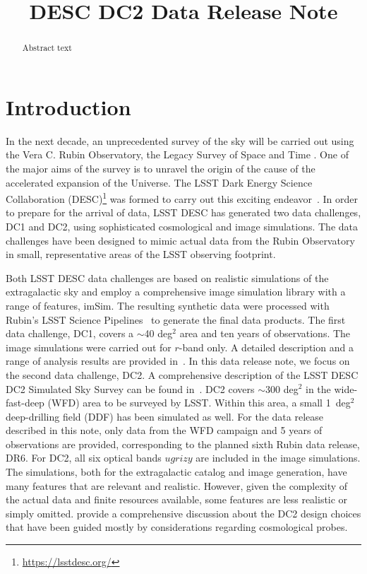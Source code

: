 \documentclass[modern]{descnote}
\begin{document}
\title{DESC DC2 Data Release Note}


\begin{abstract}
%
Abstract text
%
\clearpage
\end{abstract}

\tableofcontents

\clearpage

\section{Introduction}

In the next decade, an unprecedented survey of the sky will be carried out using the Vera C. Rubin Observatory, the Legacy Survey of Space and Time \citep{2009arXiv0912.0201L,2019ApJ...873..111I}. One of the major aims of the survey is to unravel the origin of the cause of the accelerated expansion of the Universe. The LSST Dark Energy Science Collaboration (DESC)\footnote{\url{https://lsstdesc.org/}} was formed to carry out this exciting endeavor~\citep{Abate:2012za}. In order to prepare for the arrival of data, LSST DESC has generated two data challenges, DC1 and DC2, using sophisticated cosmological and  image simulations. %
The data challenges have been designed to mimic actual data from the Rubin Observatory in small, representative areas of the LSST observing footprint.

Both LSST DESC data challenges are based on realistic simulations of the extragalactic sky and employ a comprehensive image simulation library with a range of features, imSim. The resulting synthetic data were processed with Rubin's LSST Science Pipelines~\citep{2017ASPC..512..279J} to generate the final data products. The first data challenge, DC1, covers a $\sim$40 deg$^2$ area and ten years of observations. The image simulations were carried out for $r$-band only. A detailed description and a range of analysis results are provided in~\cite{dc1}.  In this data release note, we focus on the second data challenge, DC2. A comprehensive description of the LSST DESC DC2 Simulated Sky Survey can be found in~\cite{2020arXiv201005926L}. DC2 covers $\sim$300 deg$^2$ in the wide-fast-deep (WFD) area to be surveyed by LSST. Within this area, a small 1~deg$^2$ deep-drilling field (DDF) has been simulated as well. For the data release described in this note, only data from the WFD campaign and 5 years of observations are provided, corresponding to the planned sixth Rubin data release, DR6. For DC2, all six optical bands $ugrizy$ are included in the image simulations. The simulations, both for the extragalactic catalog and image generation, have many features that are relevant and realistic. However, given the complexity of the actual data and finite resources available, some features are less realistic or simply omitted. \cite{2020arXiv201005926L} provide a comprehensive discussion about the DC2 design choices that have been guided mostly by considerations regarding cosmological probes.  
\end{document}
